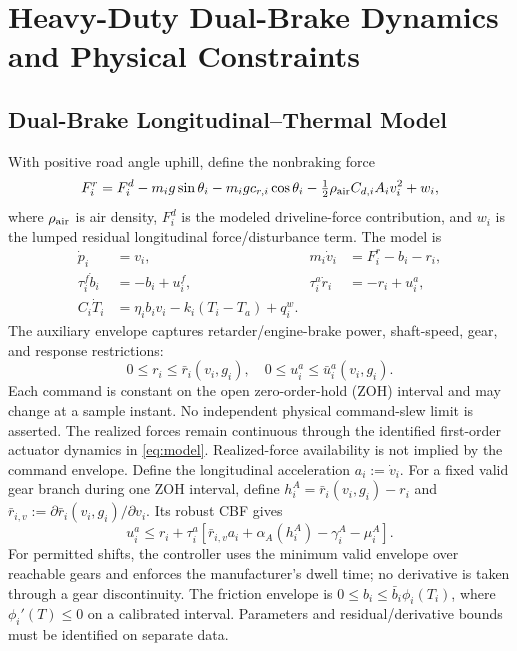 \section{Heavy-Duty Dual-Brake Dynamics and Physical Constraints}
\subsection{Dual-Brake Longitudinal--Thermal Model}
With positive road angle uphill, define the nonbraking force
\begin{equation}
F_i^r=F_i^d-m_ig\sin\theta_i-m_igc_{r,i}\cos\theta_i-
\tfrac12\rho_{\rm air}C_{d,i}A_iv_i^2+w_i,
\end{equation}
where $\rho_{\rm air}$ is air density, $F_i^d$ is the modeled driveline-force contribution, and $w_i$ is the lumped residual longitudinal force/disturbance term. The model is
\begin{subequations}\label{eq:model}
\begin{align}
\dot p_i&=v_i, & m_i\dot v_i&=F_i^r-b_i-r_i,\\
\tau_i^f\dot b_i&=-b_i+u_i^f,
&\tau_i^a\dot r_i&=-r_i+u_i^a,\\
C_i\dot T_i&=\eta_i b_iv_i-k_i(T_i-T_a)+q_i^w.
\end{align}
\end{subequations}
The auxiliary envelope captures retarder/engine-brake power, shaft-speed, gear, and response restrictions:
\begin{equation}\label{eq:auxenv}
0\le r_i\le\bar r_i(v_i,g_i),\quad
0\le u_i^a\le\bar u_i^a(v_i,g_i).
\end{equation}
Each command is constant on the open zero-order-hold (ZOH) interval and may change at a sample instant. No independent physical command-slew limit is asserted. The realized forces remain continuous through the identified first-order actuator dynamics in \eqref{eq:model}.
Realized-force availability is not implied by the command envelope. Define the longitudinal acceleration $a_i:=\dot v_i$. For a fixed valid gear branch during one ZOH interval, define $h_i^A=\bar r_i(v_i,g_i)-r_i$ and $\bar r_{i,v}:=\partial\bar r_i(v_i,g_i)/\partial v_i$. Its robust CBF gives
\begin{equation}\label{eq:auxcbf}
u_i^a\le r_i+\tau_i^a\!\left[\bar r_{i,v}a_i+\alpha_A(h_i^A)-\gamma_i^A-\mu_i^A\right].
\end{equation}
For permitted shifts, the controller uses the minimum valid envelope over reachable gears and enforces the manufacturer's dwell time; no derivative is taken through a gear discontinuity.
The friction envelope is $0\le b_i\le\bar b_i\phi_i(T_i)$, where $\phi_i'(T)\le0$ on a calibrated interval. Parameters and residual/derivative bounds must be identified on separate data.

